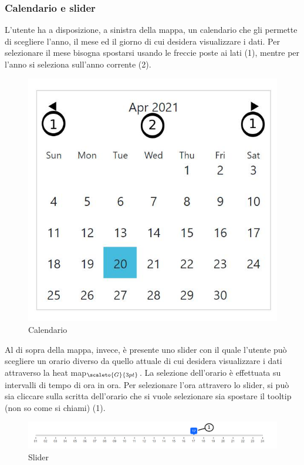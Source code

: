 \subsubsection{Calendario e slider}\label{UtilizzoDiGDPGatheringDetecionPlatformContenutoCentralePaginaInizialeHomeCalendarioESlider}
L'utente ha a disposizione, a sinistra della mappa, un calendario che gli permette di scegliere l'anno, il mese ed il giorno di cui desidera visualizzare i dati. Per selezionare il mese bisogna spostarsi usando le freccie poste ai lati (1), mentre per l'anno si seleziona sull'anno corrente (2). \\
\begin{center}
	\begin{figure}
		\includegraphics[width=0.3\linewidth]{../immagini/manualeUtente/Calendario.jpg}
		\caption{Calendario}
	\end{figure}
\end{center}
Al di sopra della mappa, invece, è presente uno slider con il quale l'utente può scegliere un orario diverso da quello attuale di cui desidera visualizzare i dati attraverso la heat map$_{\scaleto{G}{3pt}}$. La selezione dell'orario è effettuata su intervalli di tempo di ora in ora. Per selezionare l'ora attravero lo slider, si può sia cliccare sulla scritta dell'orario che si vuole selezionare sia spostare il tooltip (non so come si chiami) (1).
\begin{center}
	\begin{figure}
		\includegraphics[width=1\linewidth]{../immagini/manualeUtente/Slider.png}
		\caption{Slider}
	\end{figure}
\end{center}

